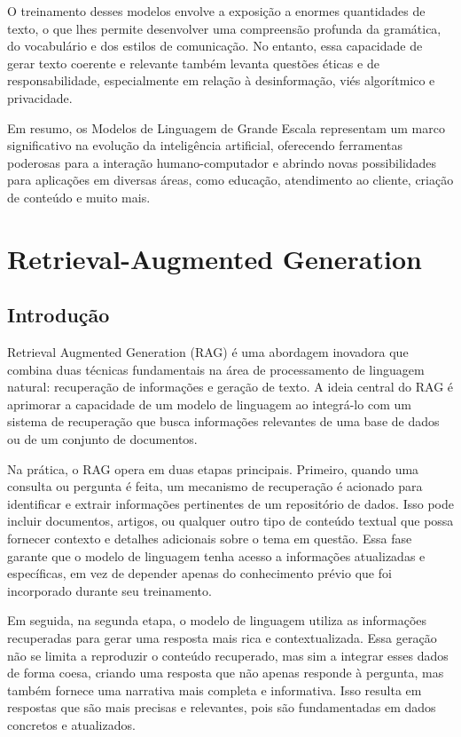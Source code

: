 \documentclass[14pt,a4paper,oneside]{book}
\begin{document}
O treinamento desses modelos envolve a exposição a enormes quantidades de texto, o que lhes permite desenvolver uma compreensão profunda da gramática, do vocabulário e dos estilos de comunicação. No entanto, essa capacidade de gerar texto coerente e relevante também levanta questões éticas e de responsabilidade, especialmente em relação à desinformação, viés algorítmico e privacidade.

Em resumo, os Modelos de Linguagem de Grande Escala representam um marco significativo na evolução da inteligência artificial, oferecendo ferramentas poderosas para a interação humano-computador e abrindo novas possibilidades para aplicações em diversas áreas, como educação, atendimento ao cliente, criação de conteúdo e muito mais.


\chapter{Retrieval-Augmented Generation}

\section{Introdução}

Retrieval Augmented Generation (RAG) é uma abordagem inovadora que combina duas técnicas fundamentais na área de processamento de linguagem natural: recuperação de informações e geração de texto. A ideia central do RAG é aprimorar a capacidade de um modelo de linguagem ao integrá-lo com um sistema de recuperação que busca informações relevantes de uma base de dados ou de um conjunto de documentos.

Na prática, o RAG opera em duas etapas principais. Primeiro, quando uma consulta ou pergunta é feita, um mecanismo de recuperação é acionado para identificar e extrair informações pertinentes de um repositório de dados. Isso pode incluir documentos, artigos, ou qualquer outro tipo de conteúdo textual que possa fornecer contexto e detalhes adicionais sobre o tema em questão. Essa fase garante que o modelo de linguagem tenha acesso a informações atualizadas e específicas, em vez de depender apenas do conhecimento prévio que foi incorporado durante seu treinamento.

Em seguida, na segunda etapa, o modelo de linguagem utiliza as informações recuperadas para gerar uma resposta mais rica e contextualizada. Essa geração não se limita a reproduzir o conteúdo recuperado, mas sim a integrar esses dados de forma coesa, criando uma resposta que não apenas responde à pergunta, mas também fornece uma narrativa mais completa e informativa. Isso resulta em respostas que são mais precisas e relevantes, pois são fundamentadas em dados concretos e atualizados.
\end{document}
